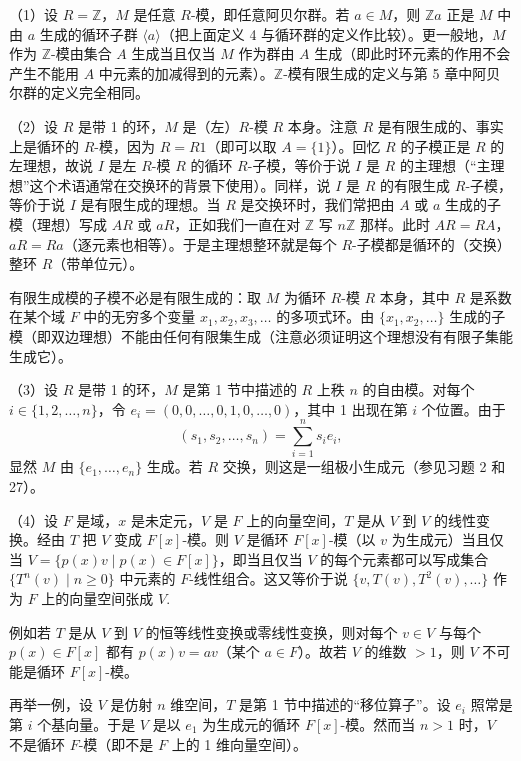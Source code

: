 \begin{example}
（1）设 \(R = \mathbb{Z}\)，\(M\) 是任意 \(R\)-模，即任意阿贝尔群。若 \(a \in M\)，则 \(\mathbb{Z}a\) 正是 \(M\) 中由 \(a\) 生成的循环子群 \(\langle a \rangle\)（把上面定义 4 与循环群的定义作比较）。更一般地，\(M\) 作为 \(\mathbb{Z}\)-模由集合 \(A\) 生成当且仅当 \(M\) 作为群由 \(A\) 生成（即此时环元素的作用不会产生不能用 \(A\) 中元素的加减得到的元素）。\(\mathbb{Z}\)-模有限生成的定义与第 5 章中阿贝尔群的定义完全相同。

（2）设 \(R\) 是带 1 的环，\(M\) 是（左）\(R\)-模 \(R\) 本身。注意 \(R\) 是有限生成的、事实上是循环的 \(R\)-模，因为 \(R = R1\)（即可以取 \(A = \{1\}\)）。回忆 \(R\) 的子模正是 \(R\) 的左理想，故说 \(I\) 是左 \(R\)-模 \(R\) 的循环 \(R\)-子模，等价于说 \(I\) 是 \(R\) 的主理想（“主理想”这个术语通常在交换环的背景下使用）。同样，说 \(I\) 是 \(R\) 的有限生成 \(R\)-子模，等价于说 \(I\) 是有限生成的理想。当 \(R\) 是交换环时，我们常把由 \(A\) 或 \(a\) 生成的子模（理想）写成 \(AR\) 或 \(aR\)，正如我们一直在对 \(\mathbb{Z}\) 写 \(n\mathbb{Z}\) 那样。此时 \(AR = RA\)，\(aR = Ra\)（逐元素也相等）。于是主理想整环就是每个 \(R\)-子模都是循环的（交换）整环 \(R\)（带单位元）。

有限生成模的子模不必是有限生成的：取 \(M\) 为循环 \(R\)-模 \(R\) 本身，其中 \(R\) 是系数在某个域 \(F\) 中的无穷多个变量 \(x_1, x_2, x_3, \ldots\) 的多项式环。由 \(\{x_1, x_2, \ldots\}\) 生成的子模（即双边理想）不能由任何有限集生成（注意必须证明这个理想没有有限子集能生成它）。

（3）设 \(R\) 是带 1 的环，\(M\) 是第 1 节中描述的 \(R\) 上秩 \(n\) 的自由模。对每个 \(i \in \{1, 2, \ldots, n\}\)，令 \(e_i = (0, 0, \ldots, 0, 1, 0, \ldots, 0)\)，其中 1 出现在第 \(i\) 个位置。由于
\[
(s_1, s_2, \ldots, s_n) = \sum_{i=1}^n s_ie_i,
\]
显然 \(M\) 由 \(\{e_1, \ldots, e_n\}\) 生成。若 \(R\) 交换，则这是一组极小生成元（参见习题 2 和 27）。

（4）设 \(F\) 是域，\(x\) 是未定元，\(V\) 是 \(F\) 上的向量空间，\(T\) 是从 \(V\) 到 \(V\) 的线性变换。经由 \(T\) 把 \(V\) 变成 \(F[x]\)-模。则 \(V\) 是循环 \(F[x]\)-模（以 \(v\) 为生成元）当且仅当 \(V = \{p(x)v \mid p(x) \in F[x]\}\)，即当且仅当 \(V\) 的每个元素都可以写成集合 \(\{T^n(v) \mid n \geq 0\}\) 中元素的 \(F\)-线性组合。这又等价于说 \(\{v, T(v), T^2(v), \ldots\}\) 作为 \(F\) 上的向量空间张成 \(V\).

例如若 \(T\) 是从 \(V\) 到 \(V\) 的恒等线性变换或零线性变换，则对每个 \(v \in V\) 与每个 \(p(x) \in F[x]\) 都有 \(p(x)v = av\)（某个 \(a \in F\)）。故若 \(V\) 的维数 \(> 1\)，则 \(V\) 不可能是循环 \(F[x]\)-模。

再举一例，设 \(V\) 是仿射 \(n\) 维空间，\(T\) 是第 1 节中描述的“移位算子”。设 \(e_i\) 照常是第 \(i\) 个基向量。于是 \(V\) 是以 \(e_1\) 为生成元的循环 \(F[x]\)-模。然而当 \(n > 1\) 时，\(V\) 不是循环 \(F\)-模（即不是 \(F\) 上的 1 维向量空间）。
\end{example}

